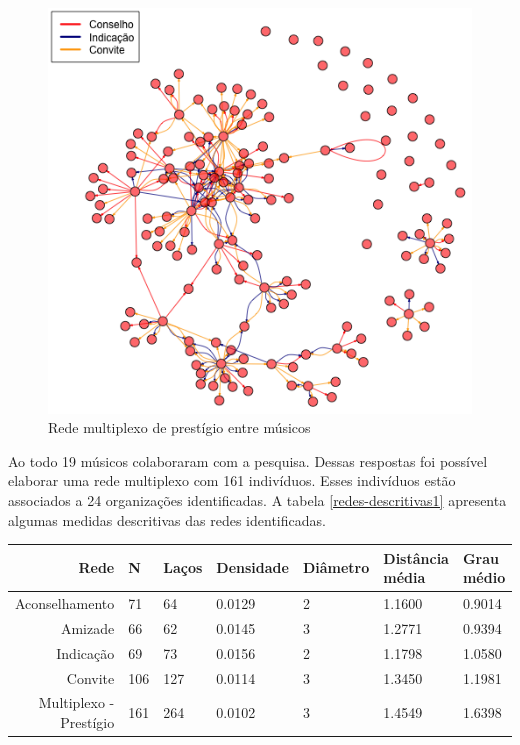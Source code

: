 \documentclass[a4paper, 12pt, openright, oneside, german, french, english, brazil]{abntex2}
\begin{document}
	\begin{figure}[!ht]
		\centering
		\caption{Rede multiplexo de prestígio entre músicos}
		\label{rede-multiplexo}
		\includegraphics[scale=.7]{rede_multiplexo.png}
	\end{figure}



	Ao todo 19 músicos colaboraram com a pesquisa. Dessas respostas foi possível elaborar uma rede multiplexo com 161 indivíduos. Esses indivíduos estão associados a 24 organizações identificadas. A tabela \ref{redes-descritivas1} apresenta algumas medidas descritivas das redes identificadas.

	\begin{table}[!ht]
		{\begin{tabular}{rllllp{1.5cm}p{1.5cm}}
			\hline
			\textbf{Rede} & \textbf{N} & \textbf{Laços} & \textbf{Densidade} & \textbf{Diâmetro} & \textbf{Distância média} & \textbf{Grau médio}  \\ 
			\hline
			Aconselhamento & 71 & 64 & 0.0129 & 2 & 1.1600 & 0.9014 \\ 
			Amizade & 66 & 62 & 0.0145 & 3 & 1.2771 & 0.9394  \\ 
			Indicação & 69 & 73 & 0.0156 & 2 & 1.1798 & 1.0580 \\ 
			Convite & 106 & 127 & 0.0114 & 3 & 1.3450 & 1.1981 \\  
			Multiplexo - Prestígio & 161 & 264 & 0.0102 & 3 & 1.4549 & 1.6398 \\
			\hline
		\end{tabular}
	}
	{}
	\end{table}
\end{document}
